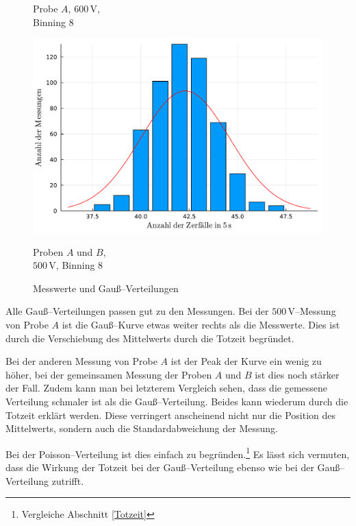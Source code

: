 \documentclass[12pt,a4paper]{scrartcl}
\numberwithin{equation}{section} %
\renewcommand{\[}{} %
\renewcommand{\]}{\noindent} %
\begin{document}
\begin{figure}[h!]
\begin{minipage}{0.3\textwidth}
		\caption*{Probe $A$, $600 \mathrm{\, V}$,\\Binning $8$}
	\end{minipage}
	\begin{minipage}{0.3\textwidth}
		\centering
		\includegraphics[width=\textwidth]{../media/B3.1/gauss3.pdf}
		\caption*{Proben $A$ und $B$,\\$500 \mathrm{\, V}$, Binning $8$}
	\end{minipage}
	\vspace{3pt}
	
	\vspace{3pt}
	
	\caption{Messwerte und Gauß--Verteilungen}
	\label{fig:gauss single}
	\vspace{12pt}
\end{figure}

\noindent
Alle Gauß--Verteilungen passen gut zu den Messungen. Bei der $500\mathrm{\,V}$--Messung von Probe $A$ ist die Gauß--Kurve etwas weiter rechts als die Messwerte. Dies ist durch die Verschiebung des Mittelwerts durch die Totzeit begründet.

Bei der anderen Messung von Probe $A$ ist der Peak der Kurve ein wenig zu höher, bei der gemeinsamen Messung der Proben $A$ und $B$ ist dies noch stärker der Fall. Zudem kann man bei letzterem Vergleich sehen, dass die gemessene Verteilung schmaler ist als die Gauß--Verteilung. Beides kann wiederum durch die Totzeit erklärt werden. Diese verringert anscheinend nicht nur die Position des Mittelwerts, sondern auch die Standardabweichung der Messung.

Bei der Poisson--Verteilung ist dies einfach zu begründen.\footnote{Vergleiche Abschnitt \ref{Totzeit}} Es lässt sich vermuten, dass die Wirkung der Totzeit bei der Gauß--Verteilung ebenso wie bei der Gauß--Verteilung zutrifft.
\end{document}
